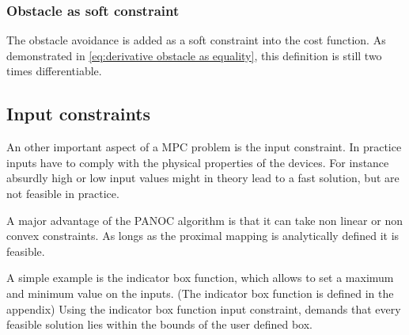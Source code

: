 			\subsubsection{Obstacle as soft constraint}
				The obstacle avoidance is added as a soft constraint into the cost function. As demonstrated in \eqref{eq:derivative obstacle as equality}, this definition is still two times differentiable.
			
		\subsection{Input constraints}
			An other important aspect of a MPC problem is the input constraint. In practice inputs have to comply with the physical properties of the devices. For instance absurdly high or low input values might in theory lead to a fast solution, but are not feasible in practice.
			
			A major advantage of the PANOC algorithm is that it can take non linear or non convex constraints. As longs as the proximal mapping is analytically defined it is feasible. 
			
			A simple example is the indicator box function, which allows to set a maximum and minimum value on the inputs. (The indicator box function is defined in the appendix) Using the  indicator box function input constraint, demands that every feasible solution lies within the bounds of the user defined box.